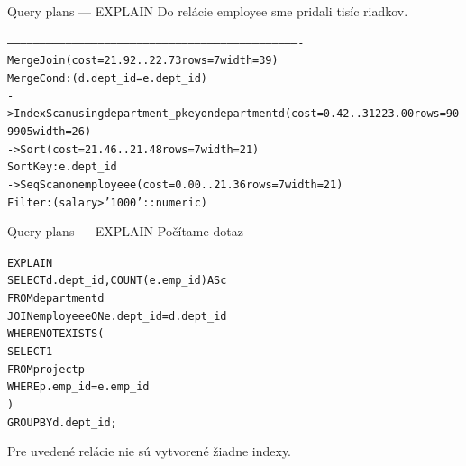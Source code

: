 \documentclass[12pt]{beamer}
\begin{document}
\begin{frame}[fragile]{Query plans --- EXPLAIN}
Do relácie employee sme pridali tisíc riadkov.
\scriptsize
\begin{alltt}
----------------------------------------------------------------------------------------------------------------------------------------
Merge Join  (cost=21.92..22.73 rows=7 width=39)
Merge Cond: (d.dept_id = e.dept_id)
  ->  Index Scan using department_pkey on department d  (cost=0.42..31223.00 rows=909905 width=26)
  ->  Sort  (cost=21.46..21.48 rows=7 width=21)
        Sort Key: e.dept_id
        ->  Seq Scan on employee e  (cost=0.00..21.36 rows=7 width=21)
              Filter: (salary > '1000'::numeric)
\end{alltt}
\end{frame}

\begin{frame}[fragile]{Query plans --- EXPLAIN}
Počítame dotaz
\begin{alltt}
\alert{EXPLAIN}
SELECT d.dept_id, COUNT(e.emp_id) AS c
FROM department d
JOIN employee e ON e.dept_id = d.dept_id
WHERE NOT EXISTS (
    SELECT 1
    FROM project p
    WHERE p.emp_id = e.emp_id
)
GROUP BY d.dept_id;
\end{alltt}
Pre uvedené relácie nie sú vytvorené žiadne indexy.
\end{frame}
\end{document}
